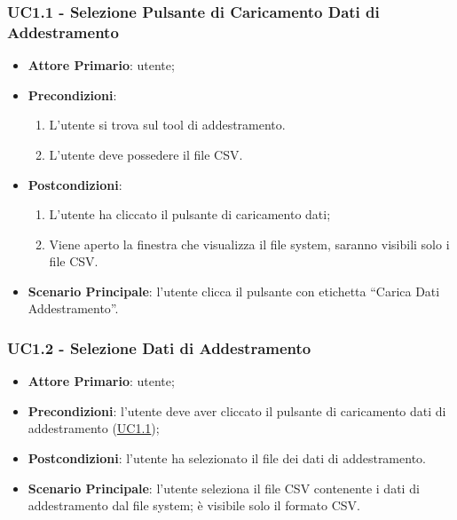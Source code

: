 		\label{par:UC1.1}
		\subsubsection{UC1.1 - Selezione Pulsante di Caricamento Dati di Addestramento}
		\begin{itemize}
			\item\textbf{Attore Primario}: utente;
			\item\textbf{Precondizioni}: 
				\begin{enumerate}
					\item L’utente si trova sul tool di addestramento.
					\item L’utente deve possedere il file CSV.
				\end{enumerate}
			\item\textbf{Postcondizioni}:
				\begin{enumerate}
					\item L’utente ha cliccato il pulsante di caricamento dati;
					\item Viene aperto la finestra che visualizza il file system, saranno visibili solo i file CSV.
				\end{enumerate}
			\item\textbf{Scenario Principale}: l’utente clicca il pulsante con etichetta “Carica Dati Addestramento”.
		\end{itemize}
		
		\label{par:UC1.2}
		\subsubsection{UC1.2 - Selezione Dati di Addestramento }
		\begin{itemize}
			\item\textbf{Attore Primario}: utente;
			\item\textbf{Precondizioni}: l’utente deve aver cliccato il pulsante di caricamento dati di addestramento (\hyperref[par:UC1.1]{UC1.1});
			\item\textbf{Postcondizioni}: l’utente ha selezionato il file dei dati di addestramento.
			\item\textbf{Scenario Principale}: l’utente seleziona il file CSV contenente i dati di addestramento dal file system; è visibile solo il formato CSV.
		\end{itemize}
		
		\label{par:UC1.3}
